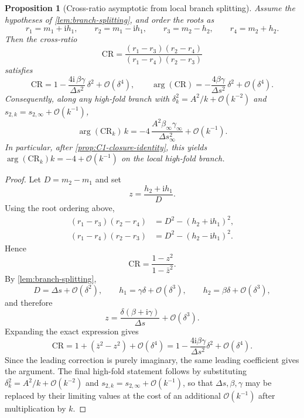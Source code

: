 \documentclass[11pt,a4paper]{article}
\theoremstyle{plain}
\newtheorem{proposition}[theorem]{Proposition}
\theoremstyle{definition}
\theoremstyle{remark}
\newcommand{\ii}{\mathrm{i}}
\newcommand{\Oo}{\mathcal{O}}
\begin{document}
\begin{proposition}[Cross-ratio asymptotic from local branch splitting]
\label{prop:arg-4}
\label{prop:CR-asymptotic}
Assume the hypotheses of \cref{lem:branch-splitting}, and order the
roots as
\[
  r_1=m_1+\ii h_1,\qquad
  r_2=m_1-\ii h_1,\qquad
  r_3=m_2-h_2,\qquad
  r_4=m_2+h_2 .
\]
Then the cross-ratio
\[
  \mathrm{CR}
  =
  \frac{(r_1-r_3)(r_2-r_4)}
       {(r_1-r_4)(r_2-r_3)}
\]
satisfies
\begin{equation}\label{eq:CR-expansion}
  \mathrm{CR}
  =
  1-\frac{4\ii\,\beta\gamma}{\Delta s^2}\,\delta^2
  +\Oo(\delta^4),
  \qquad
  \arg(\mathrm{CR})
  =
  -\frac{4\beta\gamma}{\Delta s^2}\,\delta^2
  +\Oo(\delta^4).
\end{equation}
Consequently, along any high-fold branch with
$\delta_k^2=A^2/k+\Oo(k^{-2})$ and
$s_{2,k}=s_{2,\infty}+\Oo(k^{-1})$,
\[
  \arg(\mathrm{CR}_k)\,k
  =
  -4\,\frac{A^2\beta_\infty\gamma_\infty}{\Delta s_\infty^2}
  +\Oo(k^{-1}).
\]
In particular, after \cref{prop:C1-closure-identity}, this yields
$\arg(\mathrm{CR}_k)k=-4+\Oo(k^{-1})$ on the local high-fold branch.
\end{proposition}

\begin{proof}
Let $D=m_2-m_1$ and set
\[
  z=\frac{h_2+\ii h_1}{D}.
\]
Using the root ordering above,
\begin{align*}
  (r_1-r_3)(r_2-r_4)
  &=
  D^2-(h_2+\ii h_1)^2,\\
  (r_1-r_4)(r_2-r_3)
  &=
  D^2-(h_2-\ii h_1)^2.
\end{align*}
Hence
\[
  \mathrm{CR}
  =
  \frac{1-z^2}{1-\bar z^2}.
\]
By \cref{lem:branch-splitting},
\[
  D=\Delta s+\Oo(\delta^2),
  \qquad
  h_1=\gamma\delta+\Oo(\delta^3),
  \qquad
  h_2=\beta\delta+\Oo(\delta^3),
\]
and therefore
\[
  z=\frac{\delta(\beta+\ii\gamma)}{\Delta s}+\Oo(\delta^3).
\]
Expanding the exact expression gives
\[
  \mathrm{CR}
  =
  1+(\bar z^2-z^2)+\Oo(\delta^4)
  =
  1-\frac{4\ii\beta\gamma}{\Delta s^2}\delta^2
  +\Oo(\delta^4).
\]
Since the leading correction is purely imaginary, the same leading
coefficient gives the argument.  The final high-fold statement follows
by substituting
$\delta_k^2=A^2/k+\Oo(k^{-2})$ and
$s_{2,k}=s_{2,\infty}+\Oo(k^{-1})$, so that
$\Delta s,\beta,\gamma$ may be replaced by their limiting values at
the cost of an additional $\Oo(k^{-1})$ after multiplication by $k$.
\end{proof}
\end{document}
